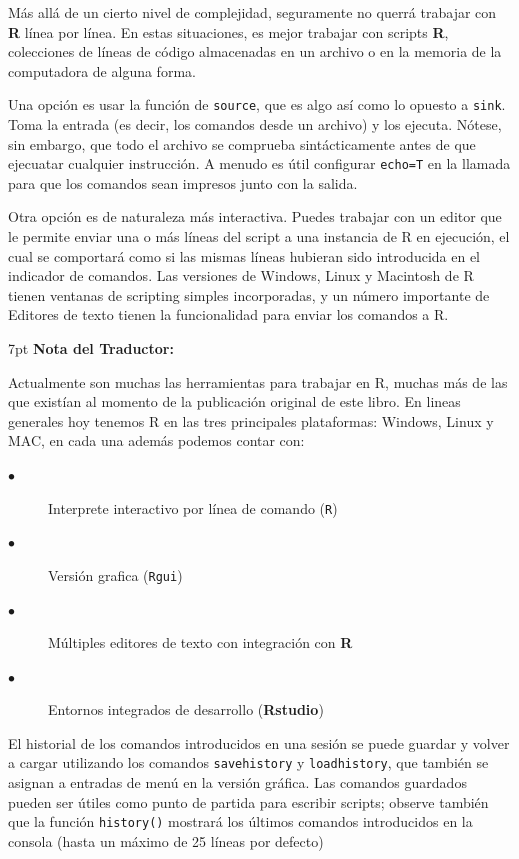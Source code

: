 \documentclass[spanish]{extbook}
\newenvironment{tradnote}{%
  \def\FrameCommand{%
    \hspace{1pt}%
    {\color{darkblue}\vrule width 2pt}%
    {\color{formalshade}\vrule width 4pt}%
    \colorbox{formalshade}%
  }%
  \vspace{12pt}
  \MakeFramed{\advance\hsize-\width\FrameRestore}%
  \noindent\hspace{-4.55pt}%
  \begin{adjustwidth}{}{7pt}%
  \vspace{1pt}%
  \textbf{Nota del Traductor:\\}%
}
{%
  \vspace{6pt}\end{adjustwidth}\endMakeFramed%
}
\numberwithin{equation}{section}
\numberwithin{figure}{section}
\begin{document}
Más allá de un cierto nivel de complejidad, seguramente no querrá trabajar con
\textbf{R} línea por línea. En estas situaciones, es mejor trabajar con scripts
\textbf{R}, colecciones de líneas de código almacenadas en un archivo o en la
memoria de la computadora de alguna forma. 

Una opción es usar la función de \texttt{source}, que es algo así como lo
opuesto a \texttt{sink}. Toma la entrada (es decir, los comandos desde un
archivo) y los ejecuta. Nótese, sin embargo, que todo el archivo se comprueba
sintácticamente antes de que ejecuatar cualquier instrucción. A menudo es útil
configurar \texttt{echo=T} en la llamada para que los comandos sean impresos
junto con la salida. 

Otra opción es de naturaleza más interactiva. Puedes trabajar con un editor que
le permite enviar una o más líneas del script a una instancia de R en
ejecución, el cual se comportará como si las mismas líneas hubieran sido
introducida en el indicador de comandos. Las versiones de Windows, Linux y
Macintosh de R tienen ventanas de scripting simples incorporadas, y un número
importante de Editores de texto tienen la funcionalidad para enviar los
comandos a R.

\begin{tradnote} 
	
	Actualmente son muchas las herramientas para trabajar en R, muchas más de
	las que existían al momento de la publicación original de este libro. En
	lineas generales hoy tenemos R en las tres principales plataformas:
	Windows, Linux y MAC, en cada una además podemos contar con:

	\begin{description}
	\item[$\bullet$] Interprete interactivo por línea de comando (\texttt{R})
	\item[$\bullet$] Versión grafica (\texttt{Rgui})
	\item[$\bullet$] Múltiples editores de texto con integración con \textbf{R}
	\item[$\bullet$] Entornos integrados de desarrollo (\textbf{Rstudio})
	\end{description}

\end{tradnote}

El historial de los comandos introducidos en una sesión se puede guardar y
volver a cargar utilizando los comandos \texttt{savehistory} y
\texttt{loadhistory}, que también se asignan a entradas de menú en la versión
gráfica. Las comandos guardados pueden ser útiles como punto de partida para
escribir scripts; observe también que la función \texttt{history()} mostrará
los últimos comandos introducidos en la consola (hasta un máximo de 25 líneas
por defecto)
\end{document}
